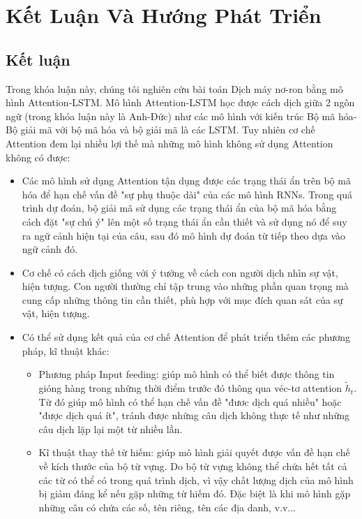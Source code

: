 \chapter{Kết Luận Và Hướng Phát Triển}
\ifpdf
    \graphicspath{{Chapter5/Chapter5Figs/PNG/}{Chapter5/Chapter5Figs/PDF/}{Chapter5/Chapter5Figs/}}
\else
    \graphicspath{{Chapter5/Chapter5Figs/EPS/}{Chapter5/Chapter5Figs/}}
\fi
\label{chap_5}

\section{Kết luận}

Trong khóa luận này, chúng tôi nghiên cứu bài toán Dịch máy nơ-ron bằng mô hình Attention-LSTM. Mô hình Attention-LSTM học được cách dịch giữa 2 ngôn ngữ (trong khóa luận này là Anh-Đức) như các mô hình với kiến trúc Bộ mã hóa-Bộ giải mã với bộ mã hóa và bộ giải mã là các LSTM. Tuy nhiên cơ chế Attention đem lại nhiều lợi thế mà những mô hình không sử dụng Attention không có được:
\begin{itemize}
	\item Các mô hình sử dụng Attention tận dụng được các trạng thái ẩn trên bộ mã hóa để hạn chế vấn đề "sự phụ thuộc dài" của các mô hình RNNs. Trong quá trình dự đoán, bộ giải mã sử dụng các trạng thái ẩn của bộ mã hóa bằng cách đặt "sự chú ý" lên một số trạng thái ẩn cần thiết và sử dụng nó để suy ra ngữ cảnh hiện tại của câu, sau đó mô hình dự đoán từ tiếp theo dựa vào ngữ cảnh đó.
	\item Cơ chế có cách dịch giống với ý tưởng về cách con người dịch nhìn sự vật, hiện tượng. Con người thường chỉ tập trung vào những phần quan trọng mà cung cấp những thông tin cần thiết, phù hợp với mục đích quan sát của sự vật, hiện tượng.
	\item Có thể sử dụng kết quả của cơ chế Attention để phát triển thêm các phương pháp, kĩ thuật khác:
	\begin{itemize}
		\item Phương pháp Input feeding: giúp mô hình có thể biết được thông tin gióng hàng trong những thời điểm trước đó thông qua véc-tơ attention $\tilde{h}_t$. Từ đó giúp mô hình có thể hạn chế vấn đề "đươc dịch quá nhiều" hoặc "được dịch quá ít", tránh được những câu dịch không thực tế như những câu dịch lặp lại một từ nhiều lần.
		\item Kĩ thuật thay thế từ hiếm: giúp mô hình giải quyết được vấn đề hạn chế về kích thước của bộ từ vựng. Do bộ từ vựng không thể chứa hết tất cả các từ có thể có trong quá trình dịch, vì vậy chất lượng dịch của mô hình bị giảm đáng kể nếu  gặp những từ hiếm đó. Đặc biệt là khi mô hình gặp những câu có chứa các số, tên riêng, tên các địa danh, v.v... 
	\end{itemize}
\end{itemize}

